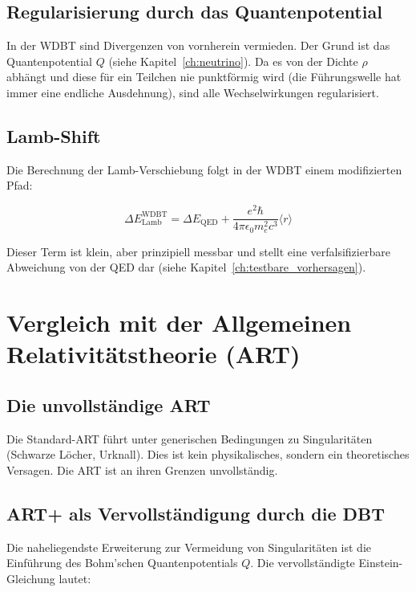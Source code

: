 \subsection{Regularisierung durch das Quantenpotential}
\label{sub:vergleich_qed_regularisierung}

In der WDBT sind Divergenzen von vornherein vermieden. Der Grund ist das Quantenpotential \( Q \) (siehe Kapitel~\ref{ch:neutrino}). Da es von der Dichte \( \rho \) abhängt und diese für ein Teilchen nie punktförmig wird (die Führungswelle hat immer eine endliche Ausdehnung), sind alle Wechselwirkungen regularisiert.

\subsection{Lamb-Shift}
\label{sub:vergleich_qed_lamb}

Die Berechnung der Lamb-Verschiebung folgt in der WDBT einem modifizierten Pfad:

\[
\Delta E_{\text{Lamb}}^{\text{WDBT}} = \Delta E_{\text{QED}} + \frac{e^2\hbar}{4\pi\epsilon_0 m_e^2 c^3} \langle r \rangle
\]

Dieser Term ist klein, aber prinzipiell messbar und stellt eine verfalsifizierbare Abweichung von der QED dar (siehe Kapitel~\ref{ch:testbare_vorhersagen}).

\section{Vergleich mit der Allgemeinen Relativitätstheorie (ART)}
\label{app:vergleich_art_details}

\subsection{Die unvollständige ART}
\label{sub:vergleich_art_unvollstaendig}

Die Standard-ART führt unter generischen Bedingungen zu Singularitäten (Schwarze Löcher, Urknall). Dies ist kein physikalisches, sondern ein theoretisches Versagen. Die ART ist an ihren Grenzen unvollständig.

\subsection{ART+ als Vervollständigung durch die DBT}
\label{sub:vergleich_art_plus}

Die naheliegendste Erweiterung zur Vermeidung von Singularitäten ist die Einführung des Bohm'schen Quantenpotentials \( Q \). Die vervollständigte Einstein-Gleichung lautet:

